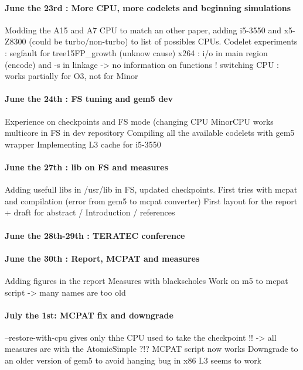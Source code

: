 \documentclass{article}
\begin{document}
\paragraph{June the 23rd : More CPU, more codelets and beginning simulations}
Modding the A15 and A7 CPU to match an other paper, adding i5-3550 and x5-Z8300 (could be turbo/non-turbo) to list of possibles CPUs.
Codelet experiments : segfault for tree15FP\_growth (unknow cause)
x264 : i/o in main region (encode) and -s in linkage -> no information on functions !
switching CPU : works partially for O3, not for Minor

\paragraph{June the 24th : FS tuning and gem5 dev}
Experience on checkpoints and FS mode (changing CPU
MinorCPU works multicore in FS in dev repository
Compiling all the available codelets with gem5 wrapper
Implementing L3 cache for i5-3550

\paragraph{June the 27th : lib on FS and measures}
Adding usefull libs in /usr/lib in FS, updated checkpoints.
First tries with mcpat and compilation (error from gem5 to mcpat converter)
First layout for the report + draft for abstract / Introduction / references

\paragraph{June the 28th-29th : TERATEC conference}

\paragraph{June the 30th : Report, MCPAT and measures}
Adding figures in the report
Measures with blackscholes
Work on m5 to mcpat script -> many names are too old

\paragraph{July the 1st: MCPAT fix and downgrade}
--restore-with-cpu gives only thhe CPU used to take the checkpoint !! -> all measures are with the AtomicSimple ?!?
MCPAT script now works
Downgrade to an older version of gem5 to avoid hanging bug in x86
L3 seems to work
\end{document}
